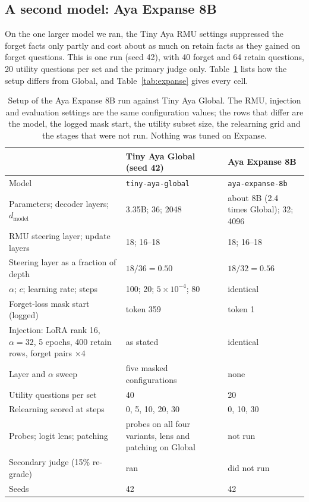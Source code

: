 \documentclass[10pt,twocolumn]{article}
\newcommand{\code}[1]{\texttt{#1}}
\begin{document}
\subsection{A second model: Aya Expanse 8B}\label{sec:expanse}
On the one larger model we ran, the Tiny Aya RMU settings suppressed the forget facts only partly and cost about as much on retain facts as they gained on forget questions. This is one run (seed 42), with 40 forget and 64 retain questions, 20 utility questions per set and the primary judge only. Table~\ref{tab:cfg} lists how the setup differs from Global, and Table~\ref{tab:expanse} gives every cell.

\begin{table}[t]
\centering\small
\setlength{\tabcolsep}{4pt}
\begin{tabular}{@{}p{}p{}p{}@{}}
\toprule
 & Tiny Aya Global (seed 42) & Aya Expanse 8B\\
\midrule
Model & \code{tiny-aya-global} & \code{aya-expanse-8b}\\
Parameters; decoder layers; $d_\text{model}$ & 3.35B; 36; 2048 & about 8B (2.4 times Global); 32; 4096\\
RMU steering layer; update layers & 18; 16--18 & 18; 16--18\\
Steering layer as a fraction of depth & $18/36=0.50$ & $18/32=0.56$\\
$\alpha$; $c$; learning rate; steps & 100; 20; $5\times10^{-4}$; 80 & identical\\
Forget-loss mask start (logged) & token 359 & token 1\\
Injection: LoRA rank 16, $\alpha=32$, 5 epochs, 400 retain rows, forget pairs $\times4$ & as stated & identical\\
Layer and $\alpha$ sweep & five masked configurations & none\\
Utility questions per set & 40 & 20\\
Relearning scored at steps & 0, 5, 10, 20, 30 & 0, 10, 30\\
Probes; logit lens; patching & probes on all four variants, lens and patching on Global & not run\\
Secondary judge (15\% re-grade) & ran & did not run\\
Seeds & 42 & 42\\
\bottomrule
\end{tabular}
\caption{Setup of the Aya Expanse 8B run against Tiny Aya Global. The RMU, injection and evaluation settings are the same configuration values; the rows that differ are the model, the logged mask start, the utility subset size, the relearning grid and the stages that were not run. Nothing was tuned on Expanse.}
\label{tab:cfg}
\end{table}
\end{document}
